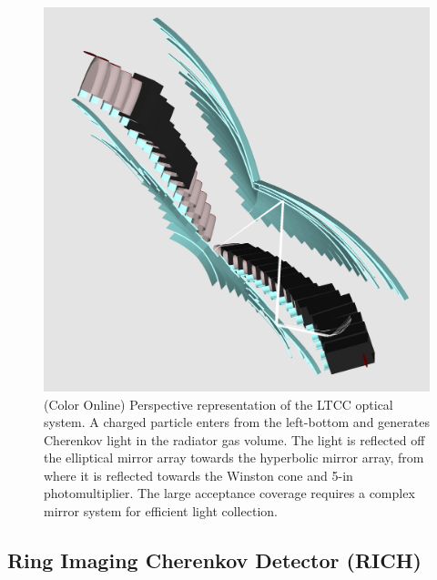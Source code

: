 \documentclass[final,3p,twocolumn]{elsarticle}
\begin{document}
\begin{figure}[htbp!]
\centerline{\includegraphics[width=1.0\columnwidth]{ltcc-mod6.png}}
\caption{(Color Online) Perspective representation of the LTCC optical system. A charged particle enters from the left-bottom and
generates Cherenkov light in the radiator gas volume. The light is reflected off the elliptical mirror array towards the
hyperbolic mirror array, from where it is reflected towards the Winston cone and 5-in photomultiplier. The large
acceptance coverage requires a complex mirror system for efficient light collection. }
\label{ltcc2}
\end{figure}

\subsection{Ring Imaging Cherenkov Detector (RICH)} 
\end{document}

